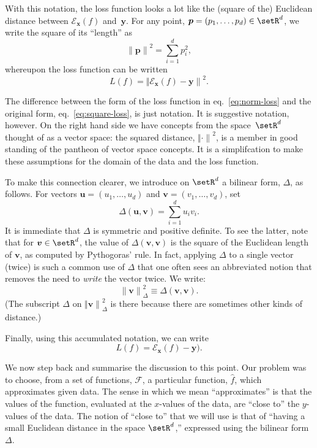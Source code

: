 \documentclass[10pt, a4paper]{article}
\begin{document}
With this notation, the loss function looks a lot like the (square of
the) Euclidean distance between $\mathcal{E}_{\bm{x}}(f)$
and~$\bm{y}$. For any point, $\bm{p}=(p_1,\dotsc, p_d)\in\setR^d$, we
write the square of its “length” as
\[
  {\lVert \bm{p} \rVert}^2 = \sum_{i=1}^d p_i^2,
\]
whereupon the loss function can be written
\begin{equation}
  \label{eq:norm-loss}
  L(f) = {\Vert \mathcal{E}_{\bm{x}}(f) - \bm{y}\rVert }^2.
\end{equation}

The difference between the form of the loss function in
eq.~\eqref{eq:norm-loss} and the original form,
eq.~\eqref{eq:square-loss}, is just notation. It is suggestive
notation, however. On the right hand side we have concepts from the
space~$\setR^d$ thought of as a vector space: the squared distance,
${\Vert\cdot\rVert}^2$, is a member in good standing of the pantheon of vector
space concepts. It is a simplifcation to make these assumptions for
the domain of the data and the loss function.
 


To make this connection clearer, we introduce on
$\setR^d$ a bilinear form, $\Delta$, as follows. For vectors
$\bm{u} = (u_1,\dotsc,u_d)$ and $\bm{v}=(v_1,\dotsc,v_d)$, set
\[
  \Delta(\bm{u}, \bm{v}) = \sum_{i=1}^d u_iv_i.
\]
It is immediate that $\Delta$ is symmetric and positive definite. To see
the latter, note that for $\bm{v}\in\setR^d$, the value of
$\Delta(\bm{v}, \bm{v})$ is the square of the Euclidean length of
$\bm{v}$, as computed by Pythogoras' rule. In fact, applying $\Delta$ to a
single vector (twice) is such a common use of $\Delta$ that one often sees
an abbreviated notion that removes the need to \emph{write} the vector
twice. We write:
\[
  {\lVert \bm{v} \rVert}_\Delta^2 \equiv \Delta(\bm{v}, \bm{v}).
\]
(The subscript $\Delta$ on ${\Vert\bm{v}\rVert}_\Delta^2$ is there because there are
sometimes other kinds of distance.)

Finally, using this accumulated notation, we can write
\begin{equation}
  L(f) = \mathcal{E}_{\bm{x}}(f) - \bm{y}).
\end{equation}

We now step back and summarise the discussion to this point. Our
problem was to choose, from a set of functions, $\mathcal{F}$, a particular
function, $\hat{f}$, which approximates given data. The sense in which
we mean “approximates” is that the values of the function, evaluated
at the $x$-values of the data, are “close to” the $y$-values of the
data. The notion of “close to” that we will use is that of “having a
small Euclidean distance in the space $\setR^d$,” expressed using the
bilinear form~$\Delta$.
\end{document}
